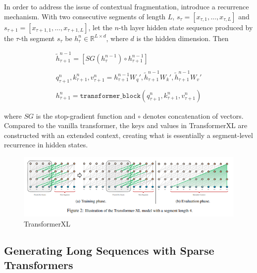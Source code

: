 \documentclass[11pt]{article}
\theoremstyle{definition}
\begin{document}
In order to address the issue of contextual fragmentation, \cite{dai2019transformerxl} introduce a recurrence mechanism. With two consecutive segments of length $L$, $s_{\tau} = \left[ x_{\tau,1},...,x_{\tau,L} \right]$ and $s_{\tau+1} = \left[x_{\tau+1,1},...,x_{\tau+1,L}\right]$, let the $n$-th layer hidden state sequence produced by the $\tau$-th segment $s_{\tau}$ be $h_{\tau}^n \in \mathbb{R}^{L \times d}$, where $d$ is the hidden dimension. Then

\begin{equation}
\begin{array}{l}
\tilde{h}_{\tau+1}^{n-1} = \left[ SG(h_{\tau}^{n-1}) \circ h_{\tau+1}^{n-1} \right] \\
\\

q_{\tau+1}^n,k_{\tau+1}^n,v_{\tau+1}^n = h_{\tau+1}^{n-1}W_q', \tilde{h}_{\tau+1}^{n-1}W_k', \tilde{h}_{\tau+1}^{n-1}W_v' \\
\\
h_{\tau+1}^n = \mathtt{transformer\_block}(q_{\tau+1}^n,k_{\tau+1}^n,v_{\tau+1}^n)
\end{array}
\end{equation}

where $SG$ is the stop-gradient function and $\circ$ denotes concatenation of vectors. Compared to the vanilla transformer, the keys and values in TransformerXL are constructed with an extended context, creating what is essentially a segment-level recurrence in hidden states.

\begin{figure}
\centering
  \includegraphics[width=\textwidth,height=\textheight,keepaspectratio]{transformers/transformerXL_model.png}
  \caption{TransformerXL \cite{dai2019transformerxl}}
  \label{fig:transformerxl}
\end{figure}


\subsection{Generating Long Sequences with Sparse Transformers}
\end{document}
